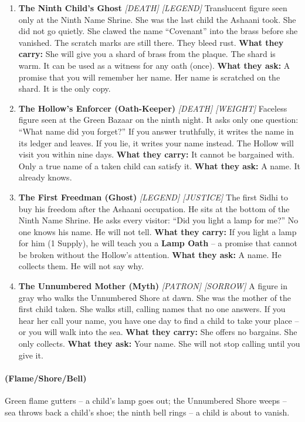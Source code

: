 \begin{enumerate}
\item[J] \textbf{The Ninth Child's Ghost} \hfill \textit{[DEATH] [LEGEND]}  
  Translucent figure seen only at the Ninth Name Shrine. She was the last child the Ashaani took. She did not go quietly. She clawed the name ``Covenant'' into the brass before she vanished. The scratch marks are still there. They bleed rust.  
  \textbf{What they carry:} She will give you a shard of brass from the plaque. The shard is warm. It can be used as a witness for any oath (once).  
  \textbf{What they ask:} A promise that you will remember her name. Her name is scratched on the shard. It is the only copy.

\item[Q] \textbf{The Hollow's Enforcer (Oath-Keeper)} \hfill \textit{[DEATH] [WEIGHT]}  
  Faceless figure seen at the Green Bazaar on the ninth night. It asks only one question: ``What name did you forget?'' If you answer truthfully, it writes the name in its ledger and leaves. If you lie, it writes your name instead. The Hollow will visit you within nine days.  
  \textbf{What they carry:} It cannot be bargained with. Only a true name of a taken child can satisfy it.  
  \textbf{What they ask:} A name. It already knows.

\item[K] \textbf{The First Freedman (Ghost)} \hfill \textit{[LEGEND] [JUSTICE]}  
  The first Sidhi to buy his freedom after the Ashaani occupation. He sits at the bottom of the Ninth Name Shrine. He asks every visitor: ``Did you light a lamp for me?'' No one knows his name. He will not tell.  
  \textbf{What they carry:} If you light a lamp for him (1 Supply), he will teach you a \textbf{Lamp Oath} -- a promise that cannot be broken without the Hollow's attention.  
  \textbf{What they ask:} A name. He collects them. He will not say why.

\item[A] \textbf{The Unnumbered Mother (Myth)} \hfill \textit{[PATRON] [SORROW]}  
  A figure in gray who walks the Unnumbered Shore at dawn. She was the mother of the first child taken. She walks still, calling names that no one answers. If you hear her call your name, you have one day to find a child to take your place -- or you will walk into the sea.  
  \textbf{What they carry:} She offers no bargains. She only collects.  
  \textbf{What they ask:} Your name. She will not stop calling until you give it.
\end{enumerate}

\paragraph*{(Flame/Shore/Bell)} Green flame gutters -- a child's lamp goes out; the Unnumbered Shore weeps -- sea throws back a child's shoe; the ninth bell rings -- a child is about to vanish.

